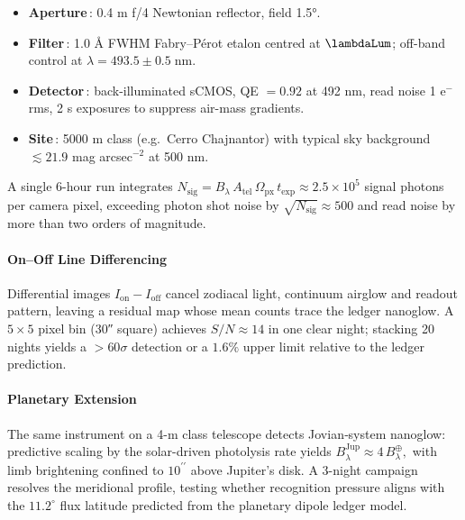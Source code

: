 \documentclass[11pt,oneside]{book}
\begin{document}
{\begin{itemize}\setlength\itemsep{3pt}
\item \textbf{Aperture}\,: 0.4 m 
  f/4 Newtonian reflector, field 1.5°.
\item \textbf{Filter}\,: 1.0 Å FWHM Fabry–Pérot etalon centred at
  \(\lambdaLum\); off-band control at
  \( \lambda=493.5 \pm 0.5\;\text{nm}\).
\item \textbf{Detector}\,: back-illuminated sCMOS,
  QE $=0.92$ at 492 nm,
  read noise 1 e$^{-}$ rms,
  2 s exposures to suppress air-mass gradients.
\item \textbf{Site}\,: 5000 m class (e.g.\ Cerro Chajnantor) with
  typical sky background $\lesssim21.9$ mag arcsec$^{-2}$ at 500 nm.
\end{itemize}

A single 6-hour run integrates
\(
   N_{\text{sig}}
   = B_{\lambda}\,A_{\text{tel}}\,
     \Omega_{\text{px}}\,t_{\text{exp}}
   \approx 2.5\times10^{5}
\)
signal photons per camera pixel,
exceeding photon shot noise by
\(
   \sqrt{N_{\text{sig}}}\approx500
\)
and read noise by more than two orders of magnitude.

\paragraph{On–Off Line Differencing}

Differential images
\(
   I_{\text{on}} - I_{\text{off}}
\)
cancel zodiacal light, continuum airglow and readout pattern,
leaving a residual map whose mean counts
trace the ledger nanoglow.  
A $5\times5$ pixel bin (30″ square) achieves
\(
   S/N\approx14
\)
in one clear night; stacking 20 nights yields a
$>60\sigma$ detection or a $1.6\%$ upper limit relative to the
ledger prediction.

\paragraph{Planetary Extension}

The same instrument on a 4-m class telescope detects 
Jovian‐system nanoglow:
predictive scaling by the
solar-driven photolysis rate yields  
\(
   B_{\lambda}^{\text{Jup}}
   \approx 4\,B_{\lambda}^{\oplus},
\)
with limb brightening confined to
\(
   10^{\prime\prime}
\)
above Jupiter’s disk.
A 3-night campaign resolves the meridional profile, testing whether
recognition pressure aligns with the 
\(11.2^{\circ}\) flux latitude predicted from the planetary dipole
ledger model.

}
\end{document}
